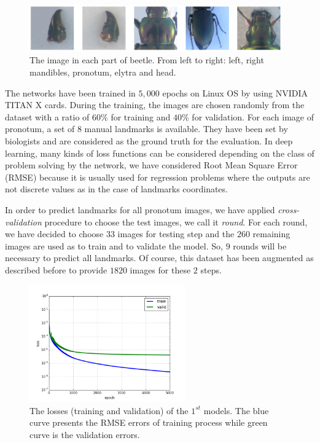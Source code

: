 \documentclass[review]{elsarticle}
\begin{document}
\begin{figure}[h]
	\centering
	\includegraphics[width=0.97\textwidth]{images/images5parts}
	\caption{The image in each part of beetle. From left to right:
          left, right mandibles, pronotum, elytra and head.}
	\label{fig5parts}
\end{figure}
The networks have been trained in $5, 000$ epochs on Linux OS by using
NVIDIA TITAN X cards. During the training, the images are chosen
randomly from the dataset with a ratio of $60\%$ for training and
$40\%$ for validation. For each image of pronotum, a set of $8$ manual
landmarks is available. They have been set by biologists and are
considered as the ground truth for the evaluation. In deep learning,
many kinds of loss functions can be considered depending on the
class of problem solving by the network, we have considered Root Mean
Square Error (RMSE) because it is usually used for regression problems
where the outputs are not discrete values as in the case of landmarks coordinates.

In order to predict landmarks for all pronotum images, we have applied
\textit{cross-validation} procedure to choose the test images, we call
it \textit{round}. For each round, we have decided to choose $33$
images for testing step and the $260$ remaining images are used as
to train and to validate the model. So, $9$ rounds will be necessary to predict
all landmarks. Of course, this dataset has been
augmented as described before to provide $1820$ images for these $2$
steps.

\begin{figure}[h!]
    \centering
    \includegraphics[width=0.6\textwidth]{images/model1_loss}
    \caption{The losses (training and validation) of the $1^{st}$ models. The
      blue curve presents the RMSE errors of training process while
      green curve is the validation errors.}
    \label{figlosses}
\end{figure}
\end{document}
